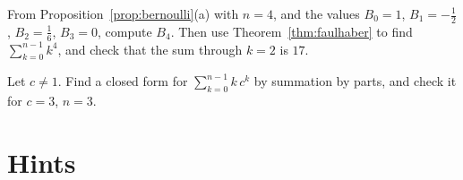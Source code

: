 \begin{exercise}[$\star\star$]\label{ex:rw01c}
From Proposition~\ref{prop:bernoulli}(a) with $n=4$, and the values $B_0=1$, $B_1=-\frac12$, $B_2=\frac16$, $B_3=0$, compute $B_4$. Then use Theorem~\ref{thm:faulhaber} to find $\sum_{k=0}^{n-1}k^4$, and check that the sum through $k=2$ is $17$.
\end{exercise}

\begin{exercise}[$\star\star\star$]\label{ex:rw01d}
Let $c\ne1$. Find a closed form for $\sum_{k=0}^{n-1}k\,c^k$ by summation by parts, and check it for $c=3$, $n=3$.
\end{exercise}

\section{Hints}

